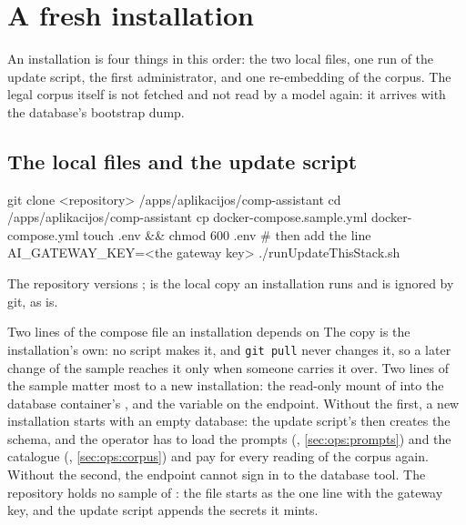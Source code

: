 \section{A fresh installation}\label{sec:ops:install}

An installation is four things in this order: the two local files, one run of the update
script, the first administrator, and one re-embedding of the corpus. The legal corpus itself
is not fetched and not read by a model again: it arrives with the database's bootstrap dump.

\subsection{The local files and the update script}

\begin{codeblock}
git clone <repository> /apps/aplikacijos/comp-assistant
cd /apps/aplikacijos/comp-assistant
cp docker-compose.sample.yml docker-compose.yml
touch .env && chmod 600 .env      # then add the line  AI_GATEWAY_KEY=<the gateway key>
./runUpdateThisStack.sh
\end{codeblock}

The repository versions ;  is the
local copy an installation runs and is ignored by git, as  is.

\begin{notebox}{Two lines of the compose file an installation depends on}
The copy is the installation's own: no script makes it, and \texttt{git pull} never changes it,
so a later change of the sample reaches it only when someone carries it over. Two lines of the
sample matter most to a new installation: the read-only mount of
 into the database container's
, and the variable  on the
endpoint. Without the first, a new installation starts with an empty database: the update
script's  then creates the schema, and the operator has to load the prompts
(, \cref{sec:ops:prompts}) and the catalogue (,
\cref{sec:ops:corpus}) and pay for every reading of the corpus again. Without the second, the
endpoint cannot sign in to the database tool. The repository holds no sample of :
the file starts as the one line with the gateway key, and the update script appends the
secrets it mints.
\end{notebox}

